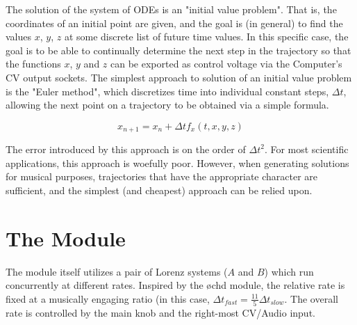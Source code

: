 \documentclass{tufte-handout}
\begin{document}
The solution of the system of ODEs is an "initial value problem". That is, the coordinates of an initial point are given, and the goal is (in general) to find the values $x$, $y$, $z$ at some discrete list of future time values. In this specific case, the goal is to be able to continually determine the next step in the trajectory so that the functions $x$, $y$ and $z$ can be exported as control voltage via the Computer's CV output sockets.
The simplest approach to solution of an initial value problem is the "Euler method", which discretizes time into individual constant steps, $\Delta t$, allowing the next point on a trajectory to be obtained via a simple formula.

$$x_{n+1} = x_n + \Delta t f_{x}(t, x, y, z)$$

The error introduced by this approach is on the order of ${\Delta t}^2$. For most scientific applications, this approach is woefully poor. However, when generating solutions for musical purposes, trajectories that have the appropriate character are sufficient, and the simplest (and cheapest) approach can be relied upon.

\section{The Module}\label{sec:the_module}

The module itself utilizes a pair of Lorenz systems ($A$ and $B$) which run concurrently at different rates. Inspired by the \o chd module, the relative rate is fixed at a musically engaging ratio (in this case, $\Delta t_{fast} = \frac{11}{5} \Delta t_{slow}$. The overall rate is controlled by the main knob and the right-most CV/Audio input. 
\end{document}
